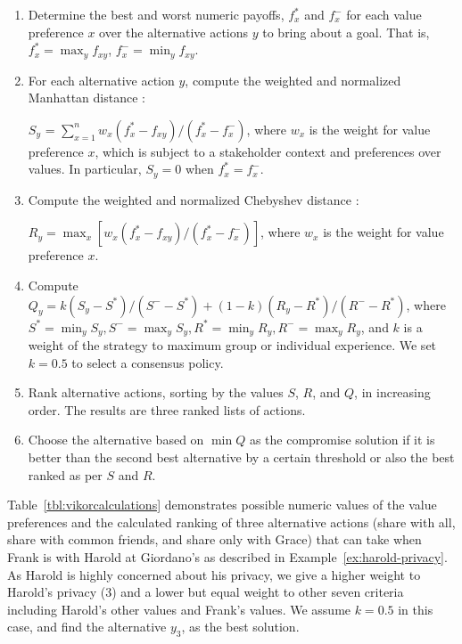 \begin{enumerate}
\item Determine the best  and worst numeric payoffs, $f_x^*$ and $f_x^-$ for each value preference $x$ over the alternative actions $y$ to bring about a goal. That is, $f_x^* = {\max}_y f_{xy}$, $f_x^- = {\min}_y f_{xy}$.

\item For each alternative action $y$, compute the weighted and normalized Manhattan distance \citep{krause1973taxicab}:

$S_y$ = $\sum_{x=1}^{n} w_x(f_x^* - f_{xy})/(f_x^* - f_x^-)$, where $w_x$ is the weight for value preference $x$, which is subject to a stakeholder context and preferences over values. In particular, $S_y=0$ when $f_x^* = f_x^-$.

\item Compute the weighted and normalized Chebyshev distance \citep{cantrell2000modern}: 

$R_y ={\max}_x [w_x(f_x^* - f_{xy})/(f_x^* - f_x^-)]$, where $w_x$ is the weight for value preference $x$.

\item Compute $Q_y = k(S_y - S^*)/(S^- - S^*) + (1-k)(R_y - R^*)/(R^- - R^*)$, where $S^* = {\min}_y S_y, S^- = {\max}_y S_y, R^* = {\min}_y R_y, R^- = {\max}_y R_y$, and $k$ is a weight of the strategy to maximum group or individual experience. We set $k = 0.5$ to select a consensus policy. 

\item Rank alternative actions, sorting by the values $S$, $R$, and $Q$, in increasing order. The results are three ranked lists of actions. 

\item Choose the alternative based on $\min{Q}$ as the compromise solution if it is better than the second best alternative by a certain threshold or also the best ranked as per $S$ and $R$. 
\end{enumerate}

Table~\ref{tbl:vikorcalculations} demonstrates possible numeric values of the value preferences and the calculated ranking of three alternative actions (share with all, share with common friends, and share only with Grace) that \locationapp can take when Frank is with Harold at Giordano's as described in Example~\ref{ex:harold-privacy}. As Harold is highly concerned about his privacy, we give a higher weight to Harold's privacy (3) and a lower but equal weight to other seven criteria including Harold's other values and Frank's values. We assume $k=0.5$ in this case, and find the alternative $y_3$,  as the best solution.

